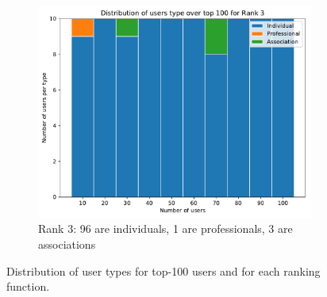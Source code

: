 \begin{figure}[htb]
	\hfill%
	\begin{subfigure}{.49\textwidth}
		\centering
		\includegraphics[width=1\textwidth]{figures/rank3-distribution.pdf}
		\caption{Rank 3: 96 are individuals, 1 are professionals, 3 are associations}
		\label{fig:rank3-distribution}
	\end{subfigure}
	\caption{Distribution of user types for top-100 users and for each ranking function.}
	\label{fig:ranks-distribution}
\end{figure}
%